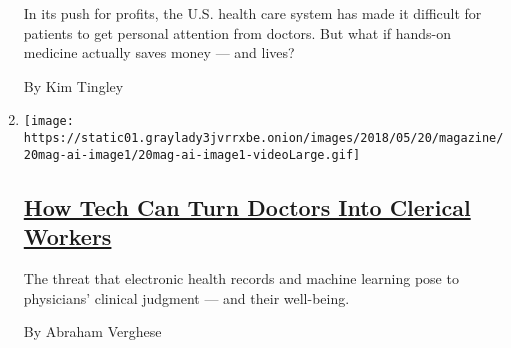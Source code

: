 \begin{enumerate}
  In its push for profits, the U.S. health care system has made it
  difficult for patients to get personal attention from doctors. But
  what if hands-on medicine actually saves money --- and lives?

  By Kim Tingley
\item
  \texttt{[image: https://static01.graylady3jvrrxbe.onion/images/2018/05/20/magazine/20mag-ai-image1/20mag-ai-image1-videoLarge.gif]}

  \hypertarget{how-tech-can-turn-doctors-into-clerical-workers}{%
  \subsection{\texorpdfstring{\href{/interactive/2018/05/16/magazine/health-issue-what-we-lose-with-data-driven-medicine.html}{How
  Tech Can Turn Doctors Into Clerical
  Workers}}{How Tech Can Turn Doctors Into Clerical Workers}}\label{how-tech-can-turn-doctors-into-clerical-workers}}

  The threat that electronic health records and machine learning pose to
  physicians' clinical judgment --- and their well-being.

  By Abraham Verghese
\end{enumerate}

